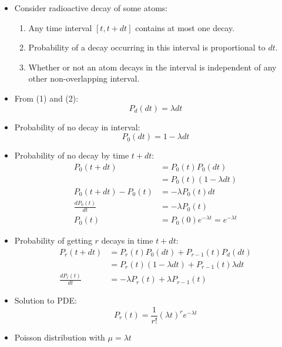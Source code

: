 \begin{itemize}
      \item Consider radioactive decay of some atoms:
            \begin{enumerate}
                  \item Any time interval $[t, t+dt]$ contains at most one decay.
                  \item Probability of a decay occurring in this interval is proportional to $dt$.
                  \item Whether or not an atom decays in the interval is independent of any other non-overlapping interval.
            \end{enumerate}

      \item From (1) and (2):
            \[ P_d(dt) = \lambda dt \]
      \item Probability of no decay in interval:
            \[ P_0(dt) = 1 - \lambda dt \]
      \item Probability of no decay by time $t + dt$:
            \begin{align*}
                  P_0(t+dt)          & = P_0(t) P_0(dt)                         \\
                                     & = P_0(t) (1 - \lambda dt)                \\
                  P_0(t+dt) - P_0(t) & = -\lambda P_0(t) dt                     \\
                  \frac{dP_0(t)}{dt} & = -\lambda P_0(t)                        \\
                  P_0(t)             & = P_0(0) e^{-\lambda t} = e^{-\lambda t}
            \end{align*}

      \item Probability of getting $r$ decays in time $t + dt$:
            \begin{align*}
                  P_r(t+dt)          & = P_r(t) P_0(dt) + P_{r-1}(t) P_d(dt)             \\
                                     & = P_r(t) (1 - \lambda dt) + P_{r-1}(t) \lambda dt \\
                  \frac{dP_r(t)}{dt} & = -\lambda P_r(t) + \lambda P_{r-1}(t)
            \end{align*}

      \item Solution to PDE:
            \[ P_r(t) = \frac{1}{r!} (\lambda t)^r e^{-\lambda t} \]
      \item Poisson distribution with $\mu = \lambda t$
\end{itemize}

